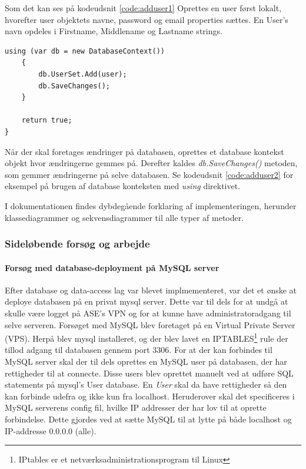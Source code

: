 Som det kan ses på kodeudsnit \ref{code:adduser1} Oprettes en user først lokalt, hvorefter user objektets navne, password og email properties sættes. En User's navn opdeles i Firstname, Middlename og Lastname strings. 

\begin{lstlisting}[caption=User objektet tilføjes i database konteksten hvorefter der gemmes på selve databasen,label=code:adduser2]
	using (var db = new DatabaseContext())
	{
		db.UserSet.Add(user);
		db.SaveChanges();
	}

	return true;
}
\end{lstlisting}

Når der skal foretages ændringer på databasen, oprettes et database kontekst objekt hvor ændringerne gemmes på. Derefter kaldes \textit{db.SaveChanges()} metoden, som gemmer ændringerne på selve databasen. Se kodeudsnit \ref{code:adduser2} for eksempel på brugen af database konteksten med \textit{using} direktivet.

I dokumentationen findes dybdegående forklaring af implementeringen, herunder klassediagrammer og sekvensdiagrammer til alle typer af metoder.

\subsubsection{Sideløbende forsøg og arbejde}

\paragraph{Forsøg med database-deployment på MySQL server}
Efter database og data-access lag var blevet implmementeret, var det et ønske at deploye databasen på en privat mysql server. Dette var til dels for at undgå at skulle være logget på ASE's VPN og for at kunne have administratoradgang til selve serveren.
Forsøget med MySQL blev foretaget på en Virtual Private Server (VPS). Herpå blev mysql installeret, og der blev lavet en IPTABLES\footnote{IPtables er et netværksadministrationsprogram til Linux} rule der tillod adgang til databasen gennem port 3306. For at der kan forbindes til MySQL server skal der til dels oprettes en MySQL user på databasen, der har rettigheder til at connecte. Disse users blev oprettet manuelt ved at udføre SQL statements på mysql’s User database. En \textit{User} skal da have rettigheder så den kan forbinde udefra og ikke kun fra localhost. Heruderover skal det specificeres i MySQL serverens config fil, hvilke IP addresser der har lov til at oprette forbindelse. Dette gjordes ved at sætte MySQL til at lytte på både localhost og IP-addresse 0.0.0.0 (alle).

